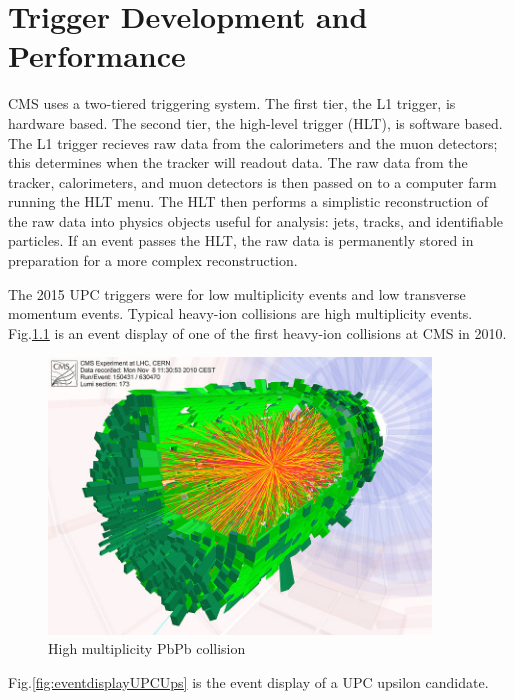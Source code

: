
\chapter{Trigger Development and Performance}

CMS uses a two-tiered triggering system. The first tier, the L1 trigger, is hardware based. The second tier, the high-level trigger (HLT), is software based. The L1 trigger recieves raw data from the calorimeters and the muon detectors; this determines when the tracker will readout data. The raw data from the tracker, calorimeters, and muon detectors is then passed on to a computer farm running the HLT menu. The HLT then performs a simplistic reconstruction of the raw data into physics objects useful for analysis: jets, tracks, and identifiable particles. If an event passes the HLT, the raw data is permanently stored in preparation for a more complex reconstruction. 

The 2015 UPC triggers were for low multiplicity events and low transverse momentum events. Typical heavy-ion collisions are high multiplicity events. Fig.\ref{fig:eventdisplayHI} is an event display of one of the first heavy-ion collisions at CMS in 2010.

\begin{figure}[h!]
\begin{centering}
\includegraphics[width=4in]{Chapter3/importfigs/cms_firstleadcoll.jpg}
\par\end{centering}
\caption{High multiplicity PbPb collision \label{fig:eventdisplayHI}}
\end{figure}

Fig.\ref{fig:eventdisplayUPCUps} is the event display of a UPC upsilon candidate.

